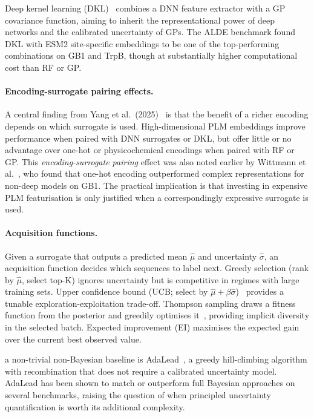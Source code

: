 \documentclass[english, 12pt, a4paper, elec, utf8, a-2b, online]{aaltothesis}
\begin{document}
Deep kernel learning (DKL)~\cite{Yang2025} combines a DNN feature extractor with a GP covariance
function, aiming to inherit the representational power of deep networks and the calibrated
uncertainty of GPs.
The ALDE benchmark found DKL with ESM2 site-specific embeddings to be one of the top-performing
combinations on GB1 and TrpB, though at substantially higher computational cost than RF or GP.

\paragraph{Encoding-surrogate pairing effects.}
A central finding from Yang et al.~(2025)~\cite{Yang2025} is that the benefit of a richer
encoding depends on which surrogate is used.
High-dimensional PLM embeddings improve performance when paired with DNN surrogates or DKL,
but offer little or no advantage over one-hot or physicochemical encodings when paired with RF or GP.
This \emph{encoding-surrogate pairing} effect was also noted earlier by Wittmann
et al.~\cite{Wittmann2021}, who found that one-hot encoding outperformed complex representations
for non-deep models on GB1.
The practical implication is that investing in expensive PLM featurisation is only justified
when a correspondingly expressive surrogate is used.

\paragraph{Acquisition functions.}
Given a surrogate that outputs a predicted mean $\hat{\mu}$ and uncertainty $\hat{\sigma}$,
an acquisition function decides which sequences to label next.
Greedy selection (rank by $\hat{\mu}$, select top-K) ignores uncertainty but is competitive
in regimes with large training sets.
Upper confidence bound (UCB; select by $\hat{\mu} + \beta\hat{\sigma}$)~\cite{Srinivas2010}
provides a tunable exploration-exploitation trade-off.
Thompson sampling draws a fitness function from the posterior and greedily optimises
it~\cite{Yang2025}, providing implicit diversity in the selected batch.
Expected improvement (EI) maximises the expected gain over the current best observed value.

a non-trivial non-Bayesian baseline is AdaLead~\cite{Sinai2020}, a greedy hill-climbing
algorithm with recombination that does not require a calibrated uncertainty model.
AdaLead has been shown to match or outperform full Bayesian approaches on several benchmarks,
raising the question of when principled uncertainty quantification is worth its additional
complexity.
\end{document}
